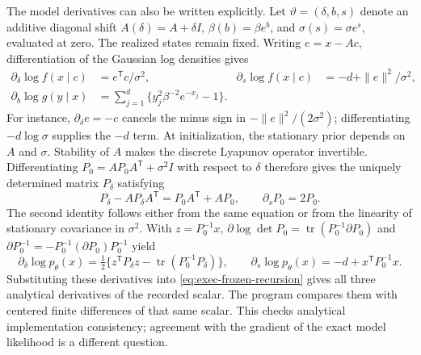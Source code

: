 \documentclass[11pt]{article}
\begin{document}
The model derivatives can also be written explicitly. Let
$\vartheta=(\delta,b,s)$ denote an additive diagonal shift
$A(\delta)=A+\delta I$, $\beta(b)=\beta e^b$, and
$\sigma(s)=\sigma e^s$, evaluated at zero. The realized states remain fixed.
Writing $e=x-Ac$, differentiation of the Gaussian log densities gives
\begin{align}
 \partial_\delta\log f(x\mid c)&=e^{\mathsf T}c/\sigma^2,&
 \partial_s\log f(x\mid c)&=-d+\|e\|^2/\sigma^2,\label{eq:exec-transition-score}\\
 \partial_b\log g(y\mid x)&=
 \sum_{j=1}^d\{y_j^2\beta^{-2}e^{-x_j}-1\}.\label{eq:exec-observation-score}
\end{align}
For instance, $\partial_\delta e=-c$ cancels the minus sign in
$-\|e\|^2/(2\sigma^2)$; differentiating $-d\log\sigma$ supplies the
$-d$ term. At initialization, the stationary prior depends on $A$ and
$\sigma$. Stability of $A$ makes the discrete Lyapunov operator invertible.
Differentiating $P_0=AP_0A^{\mathsf T}+\sigma^2I$ with respect to $\delta$
therefore gives the uniquely determined matrix $P_\delta$ satisfying
\begin{equation}
 P_\delta-AP_\delta A^{\mathsf T}=P_0A^{\mathsf T}+AP_0,
 \qquad \partial_sP_0=2P_0.
 \label{eq:exec-prior-lyapunov}
\end{equation}
The second identity follows either from the same equation or from the
linearity of stationary covariance in $\sigma^2$. With $z=P_0^{-1}x$,
$\partial\log\det P_0=\operatorname{tr}(P_0^{-1}\partial P_0)$ and
$\partial P_0^{-1}=-P_0^{-1}(\partial P_0)P_0^{-1}$ yield
\begin{equation}
 \partial_\delta\log p_\theta(x)
 =\tfrac12\{z^{\mathsf T}P_\delta z-
 \operatorname{tr}(P_0^{-1}P_\delta)\},\qquad
 \partial_s\log p_\theta(x)=-d+x^{\mathsf T}P_0^{-1}x.
 \label{eq:exec-prior-score}
\end{equation}
Substituting these derivatives into
\eqref{eq:exec-frozen-recursion} gives all three analytical derivatives of
the recorded scalar. The program compares them with centered finite
differences of that same scalar. This checks analytical implementation
consistency; agreement with the gradient of the exact model likelihood is a
different question.
\end{document}

